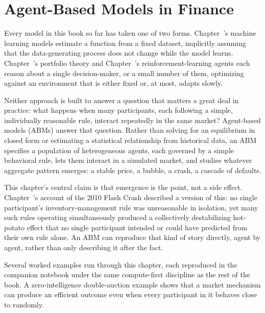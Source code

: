 \documentclass[../ai_in_finance]{subfiles}
\begin{document}
\chapter{Agent-Based Models in Finance}

Every model in this book so far has taken one of two forms. Chapter~'s machine learning models estimate a function from a fixed dataset, implicitly assuming that the data-generating process does not change while the model learns. Chapter~'s portfolio theory and Chapter~'s reinforcement-learning agents each reason about a single decision-maker, or a small number of them, optimizing against an environment that is either fixed or, at most, adapts slowly.

Neither approach is built to answer a question that matters a great deal in practice: what happens when many participants, each following a simple, individually reasonable rule, interact repeatedly in the same market? Agent-based models (ABMs) answer that question. Rather than solving for an equilibrium in closed form or estimating a statistical relationship from historical data, an ABM specifies a population of heterogeneous agents, each governed by a simple behavioral rule, lets them interact in a simulated market, and studies whatever aggregate pattern emerges: a stable price, a bubble, a crash, a cascade of defaults.

This chapter's central claim is that emergence is the point, not a side effect. Chapter~'s account of the 2010 Flash Crash described a version of this: no single participant's inventory-management rule was unreasonable in isolation, yet many such rules operating simultaneously produced a collectively destabilizing 
hot-potato effect that no single participant intended or could have predicted from their own rule alone. An ABM can reproduce that kind of 
story directly, agent by agent, rather than only describing it after the fact.

Several worked examples run through this chapter, each reproduced in the companion notebook under the same compute-first
discipline as the rest of the book. A zero-intelligence double-auction example shows that a market mechanism can produce an efficient outcome even when every participant in it behaves close to 
randomly.
\end{document}
